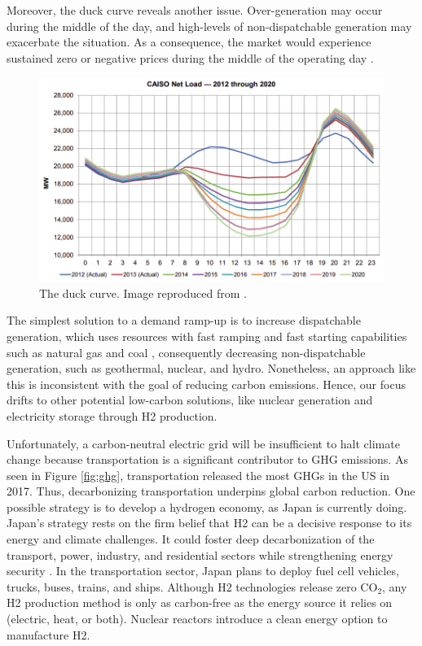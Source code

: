 Moreover, the duck curve reveals another issue.
Over-generation may occur during the middle of the day, and high-levels of non-dispatchable generation may exacerbate the situation.
As a consequence, the market would experience sustained zero or negative prices during the middle of the operating day \cite{bouillon_prepared_2014}.

\begin{figure}[htbp!]
	\centering
	\includegraphics[width=0.75\linewidth]{figures-hydro/caiso-duck.png}
	\hfill
	\caption{The duck curve. Image reproduced from \cite{bouillon_prepared_2014}.}
	\label{fig:duck}
\end{figure}

The simplest solution to a demand ramp-up is to increase dispatchable generation, which uses resources with fast ramping and fast starting capabilities such as natural gas and coal \cite{bouillon_prepared_2014}, consequently decreasing non-dispatchable generation, such as geothermal, nuclear, and hydro.
Nonetheless, an approach like this is inconsistent with the goal of reducing carbon emissions.
Hence, our focus drifts to other potential low-carbon solutions, like nuclear generation and electricity storage through \gls{H2} production.

Unfortunately, a carbon-neutral electric grid will be insufficient to halt climate change because transportation is a significant contributor to \gls{GHG} emissions.
As seen in Figure \ref{fig:ghg}, transportation released the most \glspl{GHG} in the \gls{US} in 2017. Thus, decarbonizing transportation underpins global carbon reduction.
One possible strategy is to develop a hydrogen economy, as Japan is currently doing.
Japan's strategy rests on the firm belief that \gls{H2} can be a decisive response to its energy and climate challenges.
It could foster deep decarbonization of the transport, power, industry, and residential sectors while strengthening energy security \cite{nagashima_japans_2018}.
In the transportation sector, Japan plans to deploy fuel cell vehicles, trucks, buses, trains, and ships.
Although \gls{H2} technologies release zero CO$_2$, any \gls{H2} production method is only as carbon-free as the energy source it relies on (electric, heat, or both).
Nuclear reactors introduce a clean energy option to manufacture \gls{H2}.

